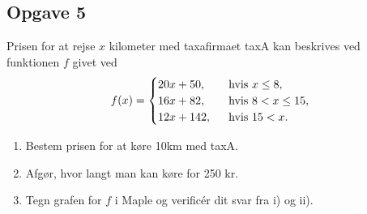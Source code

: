 \subsection*{Opgave 5}
Prisen for at rejse $x$ kilometer med taxafirmaet taxA kan beskrives ved funktionen $f$ givet ved
\begin{align*}
	f(x) =
	\begin{cases}
		20x + 50, \ &\textnormal{ hvis } x \leq 8, \\
		16x + 82, \ &\textnormal{ hvis } 8 < x \leq 15, \\
		12x + 142, \ &\textnormal{ hvis } 15 < x.
	\end{cases}
\end{align*}

\begin{enumerate}[label = \roman*)]
	\item Bestem prisen for at køre 10km med taxA.
	\item Afgør, hvor langt man kan køre for 250 kr.
	\item Tegn grafen for $f$ i Maple og verificér dit svar fra i) og ii).
\end{enumerate}

